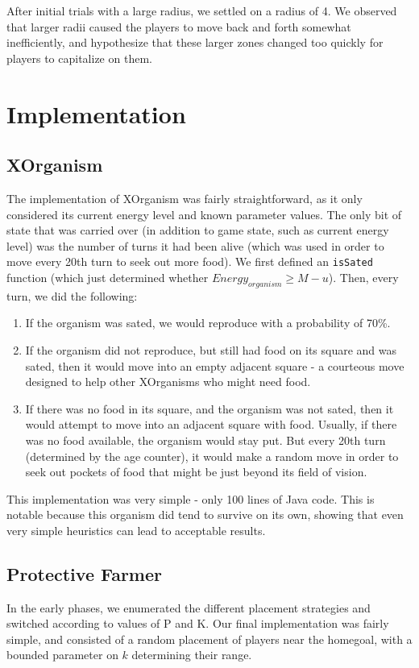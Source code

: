 \documentclass[
10pt, %
letterpaper, %
oneside, %
headinclude,footinclude, %
english
]{article}
\begin{document}
After initial trials with a large radius, we settled on a radius of 4. We observed that larger radii caused the players to move back and forth somewhat inefficiently, and hypothesize that these larger zones changed too quickly for players to capitalize on them.

\section{Implementation}

\subsection{XOrganism}

The implementation of XOrganism was fairly straightforward, as it only considered its current energy level and known parameter values. The only bit of state that was carried over (in addition to game state, such as current energy level) was the number of turns it had been alive (which was used in order to move every 20th turn to seek out more food). We first defined an \texttt{isSated} function (which just determined whether $Energy_{organism} \geq M - u$). Then, every turn, we did the following:

\begin{enumerate}
  \item If the organism was sated, we would reproduce with a probability of 70\%.
  \item If the organism did not reproduce, but still had food on its square and was sated, then it would move into an empty adjacent square - a courteous move designed to help other XOrganisms who might need food.
  \item If there was no food in its square, and the organism was not sated, then it would attempt to move into an adjacent square with food. Usually, if there was no food available, the organism would stay put. But every 20th turn (determined by the age counter), it would make a random move in order to seek out pockets of food that might be just beyond its field of vision.
\end{enumerate}

This implementation was very simple - only 100 lines of Java code. This is notable because this organism did tend to survive on its own, showing that even very simple heuristics can lead to acceptable results.

\subsection{Protective Farmer}
In the early phases, we enumerated the different placement strategies and switched according to values of P and K. Our final implementation was fairly simple, and consisted of a random placement of players near the homegoal, with a bounded parameter on $k$ determining their range.
\end{document}
